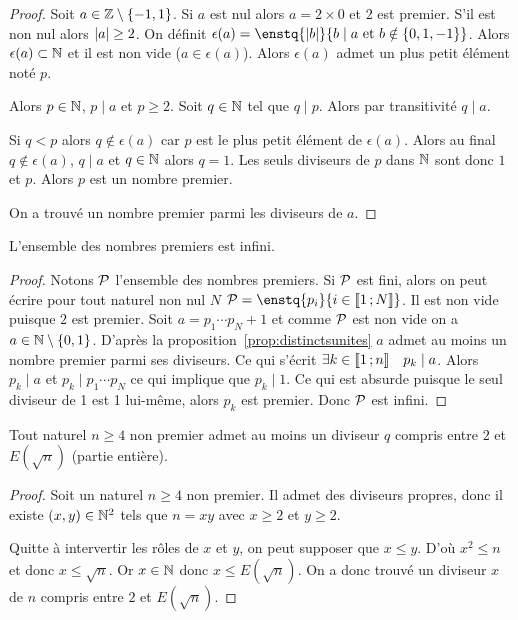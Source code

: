 \begin{proof}
  Soit $a \in \Z \setminus \{-1,1\}$. Si $a$ est nul alors $a=2 \times 0$ et $2$ est premier. S'il est non nul alors $\abs{a} \geq 2$. On définit $\epsilon(a)=\enstq{\abs{b}}{b \mid a \text{~et~} b\notin \{0,1,-1\}}$. Alors $\epsilon(a) \subset \N$ et il est non vide ($a \in \epsilon(a)$). Alors $\epsilon(a)$ admet un plus petit élément noté $p$. 

Alors $p \in \N$, $p \mid a$ et $p \geq 2$. Soit $q \in \N$ tel que $q \mid p$. Alors par transitivité $q \mid a$.

Si $q<p$ alors $q \notin \epsilon(a)$ car $p$ est le plus petit élément de $\epsilon(a)$. Alors au final $q \notin \epsilon(a)$, $q \mid a$ et $q \in \N$ alors $q=1$. Les seuls diviseurs de $p$ dans $\N$ sont donc $1$ et $p$. Alors $p$ est un nombre premier.

On a trouvé un nombre premier parmi les diviseurs de $a$.
\end{proof}
\begin{prop}
  L'ensemble des nombres premiers est infini.
\end{prop}
\begin{proof}
  Notons $\P$ l'ensemble des nombres premiers. Si $\P$ est fini, alors on peut écrire pour tout naturel non nul $N$ $\P=\enstq{p_i}{i \in \intervalleentier{1}{N}}$. Il est non vide puisque $2$ est premier. Soit $a=p_1 \dotsm  p_N +1$ et comme $\P$ est non vide on a $a \in \N \setminus \{0,1\}$. D'après la proposition~\ref{prop:distinctsunites} $a$ admet au moins un nombre premier parmi ses diviseurs. Ce qui s'écrit $\exists k \in \intervalleentier{1}{n} \quad p_k \mid a$. Alors $p_k \mid a$ et $p_k \mid p_1 \dotsm p_N$ ce qui implique que $p_k \mid 1$. Ce qui est absurde puisque le seul diviseur de 1 est 1 lui-même, alors $p_k$ est premier. Donc $\P$ est infini.
\end{proof}

\begin{prop}
  Tout naturel $n \geq 4$ non premier admet au moins un diviseur $q$ compris entre $2$ et $E(\sqrt{n})$ (partie entière).
\end{prop}
\begin{proof}
  Soit un naturel $n \geq 4$ non  premier. Il admet des diviseurs propres, donc il existe $(x,y) \in \N^2$ tels que $n=xy$ avec $x \geq 2$ et $y \geq 2$.

  Quitte à intervertir les rôles de $x$ et $y$, on peut supposer que $x \leq y$. D'où $x^2 \leq n$ et donc $x \leq \sqrt{n}$. Or $x \in \N$ donc $x \leq E(\sqrt{n})$. On a donc trouvé un diviseur $x$ de $n$ compris entre $2$ et $E(\sqrt{n})$.
\end{proof}

